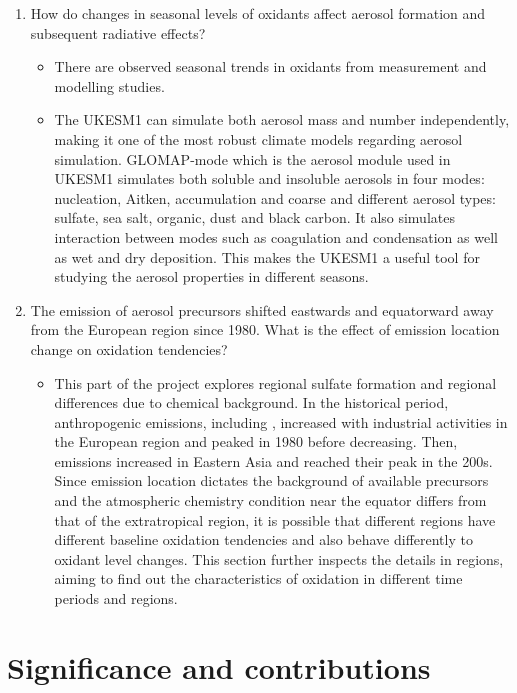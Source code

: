 \begin{enumerate}
    \item How do changes in seasonal levels of oxidants affect aerosol formation and subsequent radiative effects?

    \begin{itemize}
        \item There are observed seasonal trends in oxidants from measurement and modelling studies.
        \item The UKESM1 can simulate both aerosol mass and number independently, making it one of the most robust climate models regarding aerosol simulation. GLOMAP-mode which is the aerosol module used in UKESM1 simulates both soluble and insoluble aerosols in four modes: nucleation, Aitken, accumulation and coarse and different aerosol types: sulfate, sea salt, organic, dust and black carbon. It also simulates interaction between modes such as coagulation and condensation as well as wet and dry deposition. This makes the UKESM1 a useful tool for studying the aerosol properties in different seasons.
    \end{itemize}

    \item The emission of aerosol precursors shifted eastwards and equatorward away from the European region since 1980. What is the effect of emission location change on oxidation tendencies?

    \begin{itemize}
        \item This part of the project explores regional sulfate formation and regional differences due to chemical background. In the historical period, anthropogenic emissions, including , increased with industrial activities in the European region and peaked in 1980 before decreasing. Then, emissions increased in Eastern Asia and reached their peak in the 200s. Since  emission location dictates the background of available precursors and the atmospheric chemistry condition near the equator differs from that of the extratropical region, it is possible that different regions have different baseline oxidation tendencies and also behave differently to oxidant level changes. This section further inspects the details in regions, aiming to find out the characteristics of oxidation in different time periods and regions.  
    \end{itemize}
    
\end{enumerate}

\section{Significance and contributions}

